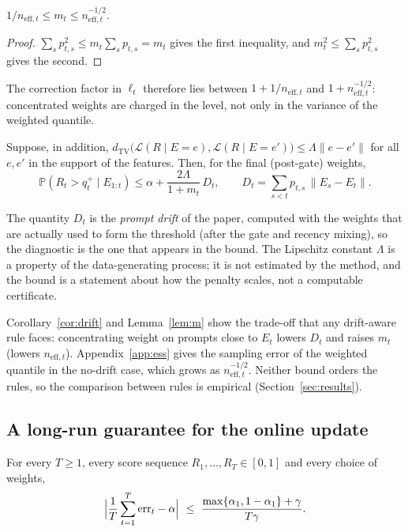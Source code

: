 \begin{lemma}\label{lem:m}
$1/n_{\mathrm{eff},t}\le m_t\le n_{\mathrm{eff},t}^{-1/2}$.
\end{lemma}
\begin{proof}
$\sum_s p_{t,s}^2\le m_t\sum_s p_{t,s}=m_t$ gives the first inequality, and $m_t^2\le\sum_s p_{t,s}^2$ gives the second.
\end{proof}
The correction factor in $\ell_t$ therefore lies between $1+1/n_{\mathrm{eff},t}$ and $1+n_{\mathrm{eff},t}^{-1/2}$: concentrated weights are
charged in the level, not only in the variance of the weighted quantile.

\begin{corollary}\label{cor:drift}
Suppose, in addition, $d_{\mathrm{TV}}\bigl(\mathcal L(R\mid E=e),\mathcal L(R\mid E=e')\bigr)\le \Lambda\|e-e'\|$ for all
$e,e'$ in the support of the features. Then, for the final (post-gate) weights,
\[
 \mathbb P(R_t>q_t^{+}\mid E_{1:t})\le\alpha+\frac{2\Lambda}{1+m_t}\,D_t,\qquad
 D_t=\sum_{s<t}p_{t,s}\,\|E_s-E_t\|.
\]
\end{corollary}

The quantity $D_t$ is the \emph{prompt drift} of the paper, computed with the weights that are actually used
to form the threshold (after the gate and recency mixing), so the diagnostic is the one that appears in the bound.
The Lipschitz constant $\Lambda$ is a property of the data-generating process; it is not estimated by the method,
and the bound is a statement about how the penalty scales, not a computable certificate.


Corollary~\ref{cor:drift} and Lemma~\ref{lem:m} show the trade-off that any drift-aware rule faces: concentrating weight on prompts close to
$E_t$ lowers $D_t$ and raises $m_t$ (lowers $n_{\mathrm{eff},t}$). Appendix~\ref{app:ess} gives the sampling error of the weighted quantile in the
no-drift case, which grows as $n_{\mathrm{eff},t}^{-1/2}$. Neither bound orders the rules, so the comparison between rules is empirical
(Section~\ref{sec:results}).

\subsection{A long-run guarantee for the online update}

\begin{theorem}\label{thm:longrun}
For every $T\ge1$, every score sequence $R_1,\dots,R_T\in[0,1]$ and every choice of weights,
\[
 \Bigl|\frac1T\sum_{t=1}^T\mathrm{err}_t-\alpha\Bigr|\ \le\ \frac{\max\{\alpha_1,1-\alpha_1\}+\gamma}{T\gamma}.
\]
\end{theorem}

